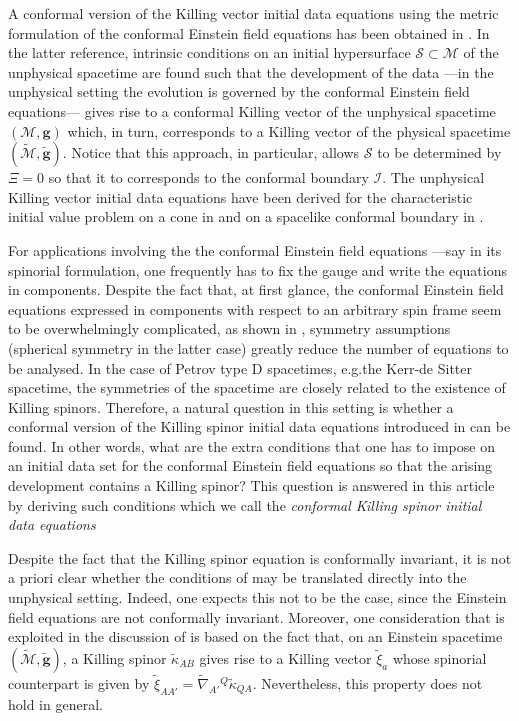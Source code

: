 \documentclass[10pt,a4paper]{article}
\theoremstyle{plain}
\def\bmg{{\bm g}}
\begin{document}
\medskip

A conformal version of the Killing vector initial data equations using
the metric formulation of the conformal Einstein field equations has
been obtained in \cite{Pae14a}.  In the latter reference, intrinsic
conditions on an initial hypersurface $\mathcal{S}\subset \mathcal{M}$
of the unphysical spacetime are found such that the development of the
data ---in the unphysical setting the evolution is governed by the
conformal Einstein field equations--- gives rise to a conformal
Killing vector of the unphysical spacetime $(\mathcal{M},\bmg)$ which, in
turn, corresponds to a Killing vector of the physical spacetime
$(\tilde{\mathcal{M}},\tilde{\bmg})$.  Notice that this approach, in
particular, allows $\mathcal{S}$ to be determined by $\Xi=0$ so that
it to corresponds to the conformal boundary $\mathscr{I}$.  The
unphysical Killing vector initial data equations have been derived for
the characteristic initial value problem on a cone in \cite{Pae14a}
and on a spacelike conformal boundary in \cite{Pae14}.


\medskip
For applications involving the the conformal Einstein field equations
---say in its spinorial formulation, one frequently has to fix the
gauge and write the equations in components.  Despite the fact that,
at first glance, the conformal Einstein field equations expressed in
components with respect to an arbitrary spin frame seem to be
overwhelmingly complicated, as shown in \cite{GasVal17}, symmetry
assumptions (spherical symmetry in the latter case) greatly reduce the
number of equations to be analysed.  In the case of Petrov type D
spacetimes, e.g.the Kerr-de Sitter spacetime, the symmetries of the
spacetime are closely related to the existence of Killing spinors.
Therefore, a natural question in this setting is whether a conformal
version of the Killing spinor initial data equations introduced in
\cite{GarVal08c} can be found. In other words, what are the extra
conditions that one has to impose on an initial data set for the
conformal Einstein field equations so that the arising development
contains a Killing spinor?  This question is answered in this article
by deriving such conditions which we call the \emph{conformal Killing
  spinor initial data equations}

Despite the fact that the
Killing spinor equation is conformally invariant, it is not a priori
clear whether the conditions 
of \cite{GarVal08c, BaeVal10b} may be translated directly into the unphysical setting.
Indeed, one expects this not to be the case, since the Einstein field equations
are not conformally invariant. Moreover, one consideration that is
exploited in the discussion of \cite{GarVal08c} is based on the fact
that, on an Einstein spacetime $(\tilde{\mathcal{M}},\tilde{\bmg})$, a
Killing spinor $\tilde{\kappa}_{AB}$ gives rise to a Killing vector
$\tilde{\xi}_{a}$ whose spinorial counterpart is given by
$\tilde{\xi}_{AA'}=\tilde{\nabla}_{A'}{}^{Q}\tilde{\kappa}_{QA}$. Nevertheless,
this property does not hold in general.
\end{document}
